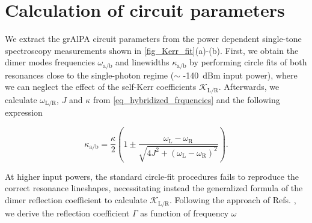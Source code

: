 \documentclass[%
reprint,
floatfix,
superscriptaddress,
amsmath,amssymb,
aps,
pra,
]{revtex4-2}
\begin{document}
\section{Calculation of circuit parameters}
\label{A_circuitParameters}
We extract the grAlPA circuit parameters from the power dependent single-tone spectroscopy measurements shown in \cref{fig_Kerr_fit}(a)-(b). First, we obtain the dimer modes frequencies $\omega\mathrm{_{a/b}}$ and linewidths $\kappa\mathrm{_{a/b}}$ by performing circle fits of both resonances close to the single-photon regime ($\sim$ -140~dBm input power), where we can neglect the effect of the self-Kerr coefficients $\mathcal{K}\mathrm{_{L/R}}$.  Afterwards, we calculate $\omega\mathrm{_{L/R}}$, $J$ and $\kappa$ from \cref{eq_hybridized_frquencies} and the following expression \cite{Eichler2014Dimer}

\begin{equation}
\kappa\mathrm{_{a/b}} =\frac{\kappa}{2}\left( 1 \pm \frac{\omega\mathrm{_L}-\omega\mathrm{_R}}{\sqrt{4J^2 + \left(\omega\mathrm{_L}-\omega\mathrm{_R}\right)^2}} \right).
\label{eq_kappas_omegas_hybrid}
\end{equation}

At higher input powers, the standard circle-fit procedures fails to reproduce the correct resonance lineshapes, necessitating instead the generalized formula of the dimer reflection coefficient to calculate $\mathcal{K}\mathrm{_{L/R}}$. Following the approach of Refs. \cite{Eichler2014Sat,Eichler2014Dimer}, we derive the reflection coefficient $\Gamma$ as function of frequency $\omega$
\end{document}
